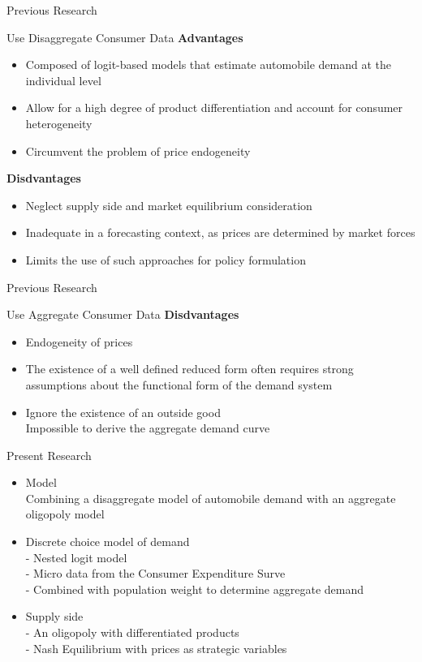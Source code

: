 \documentclass{beamer}
\begin{document}
\begin{frame}{Previous Research}
	\begin{block}{Use Disaggregate Consumer Data}
	\textbf{Advantages}
		\begin{itemize}
	\item Composed of logit-based models that estimate automobile demand at the individual level
	\item Allow for a high degree of product differentiation and account for consumer heterogeneity
	\item Circumvent the problem of price endogeneity
		\end{itemize}
	\textbf{Disdvantages}
		\begin{itemize}
	\item Neglect supply side and market equilibrium consideration
	\item Inadequate in a forecasting context, as prices are determined by market forces
	\item Limits the use of such approaches for policy formulation
		\end{itemize}
	\end{block}
\end{frame}
\begin{frame}{Previous Research}
	\begin{block}{Use Aggregate Consumer Data}
	\textbf{Disdvantages}
	\begin{itemize}
	\item Endogeneity of prices
	\item The existence of a well defined reduced form often requires strong assumptions about the functional form of the demand system
	\end{itemize}
	\end{block}
\begin{itemize}
	\item Ignore the existence of an outside good \\
	Impossible to derive the aggregate demand curve
\end{itemize}
\end{frame}
\begin{frame}{Present Research}
	\begin{itemize}
		\item Model \\
		Combining a disaggregate model of automobile demand with an aggregate oligopoly model
		\item Discrete choice model of demand \\
		- Nested logit model \\
		- Micro data from the Consumer Expenditure Surve \\
		- Combined with population weight to determine aggregate demand
		\item Supply side \\
		- An oligopoly with differentiated products \\
		- Nash Equilibrium with prices as strategic variables
	\end{itemize}
\end{frame}
\end{document}
